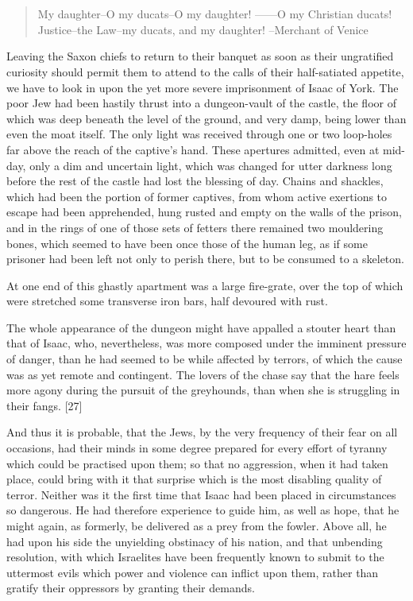\chapter{}

\begin{quote}
My daughter--O my ducats--O my daughter!
------O my Christian ducats!
Justice--the Law--my ducats, and my daughter!
--Merchant of Venice
\end{quote}

Leaving the Saxon chiefs to return to their banquet as soon as their
ungratified curiosity should permit them to attend to the calls of their
half-satiated appetite, we have to look in upon the yet more severe
imprisonment of Isaac of York. The poor Jew had been hastily thrust into
a dungeon-vault of the castle, the floor of which was deep beneath the
level of the ground, and very damp, being lower than even the moat
itself. The only light was received through one or two loop-holes far
above the reach of the captive's hand. These apertures admitted, even at
mid-day, only a dim and uncertain light, which was changed for utter
darkness long before the rest of the castle had lost the blessing of
day. Chains and shackles, which had been the portion of former captives,
from whom active exertions to escape had been apprehended, hung rusted
and empty on the walls of the prison, and in the rings of one of those
sets of fetters there remained two mouldering bones, which seemed to
have been once those of the human leg, as if some prisoner had been left
not only to perish there, but to be consumed to a skeleton.

At one end of this ghastly apartment was a large fire-grate, over the
top of which were stretched some transverse iron bars, half devoured
with rust.

The whole appearance of the dungeon might have appalled a stouter heart
than that of Isaac, who, nevertheless, was more composed under the
imminent pressure of danger, than he had seemed to be while affected by
terrors, of which the cause was as yet remote and contingent. The lovers
of the chase say that the hare feels more agony during the pursuit of
the greyhounds, than when she is struggling in their fangs. {[}27{]}

And thus it is probable, that the Jews, by the very frequency of their
fear on all occasions, had their minds in some degree prepared for every
effort of tyranny which could be practised upon them; so that no
aggression, when it had taken place, could bring with it that surprise
which is the most disabling quality of terror. Neither was it the first
time that Isaac had been placed in circumstances so dangerous. He had
therefore experience to guide him, as well as hope, that he might again,
as formerly, be delivered as a prey from the fowler. Above all, he had
upon his side the unyielding obstinacy of his nation, and that unbending
resolution, with which Israelites have been frequently known to submit
to the uttermost evils which power and violence can inflict upon them,
rather than gratify their oppressors by granting their demands.

